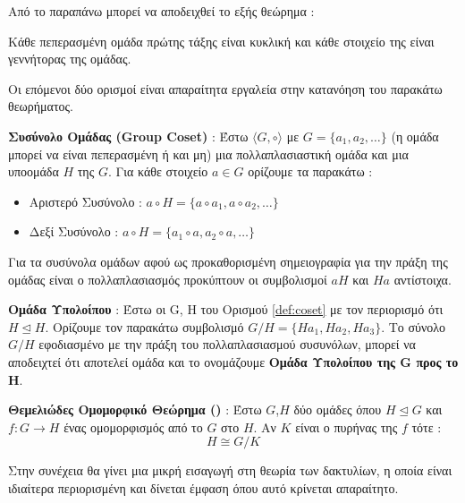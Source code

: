 Από το παραπάνω μπορεί να αποδειχθεί το εξής θεώρημα :
\begin{theorem}
Κάθε πεπερασμένη ομάδα πρώτης τάξης είναι κυκλική και κάθε στοιχείο της είναι γεννήτορας της ομάδας.
\end{theorem}

Οι επόμενοι δύο ορισμοί είναι απαραίτητα εργαλεία στην κατανόηση του παρακάτω θεωρήματος.

\begin{definition}
\label{def:coset}
\textbf{Συσύνολο Ομάδας (Group Coset)} : Έστω $\langle G, \circ \rangle$ με $G = \{a_1, a_2, \ldots\}$ (η ομάδα μπορεί να είναι πεπερασμένη ή και μη) μια πολλαπλασιαστική ομάδα και μια υποομάδα $Η$ της $G$. Για κάθε στοιχείο $a \in G$ ορίζουμε τα παρακάτω :
\begin{itemize}
    \item Αριστερό Συσύνολο : $a \circ H = \{a \circ a_1, a \circ a_2, \ldots\}$
    \item Δεξί Συσύνολο : $a \circ H = \{a_1 \circ a, a_2 \circ a, \ldots\}$
\end{itemize}
\end{definition}

Για τα συσύνολα ομάδων αφού ως προκαθορισμένη σημειογραφία για την πράξη της ομάδας είναι ο πολλαπλασιασμός προκύπτουν οι συμβολισμοί $aΗ$ και $Ha$ αντίστοιχα.

\begin{definition}
\textbf{Ομάδα Υπολοίπου} : Έστω οι G, H του Ορισμού \ref{def:coset} με τον περιορισμό ότι $H \trianglelefteq H$. Ορίζουμε τον παρακάτω συμβολισμό $G / H = \{Ha_1, Ha_2, Ha_3\}$. Το σύνολο $G / H$ εφοδιασμένο με την πράξη του πολλαπλασιασμού συσυνόλων, μπορεί να αποδειχτεί ότι αποτελεί ομάδα και το ονομάζουμε \textbf{Ομάδα Υπολοίπου της G προς το H}.
\end{definition}

\begin{definition}
\textbf{Θεμελιώδες Ομομορφικό Θεώρημα ()} : Έστω $G$,$H$ δύο ομάδες όπου $H \trianglelefteq G$ και $f : G \rightarrow H$ ένας ομομορφισμός από το $G$ στο $H$. Αν $K$ είναι ο πυρήνας της $f$ τότε :
$$
Η \cong G / K
$$
\end{definition}

Στην συνέχεια θα γίνει μια μικρή εισαγωγή στη θεωρία των δακτυλίων, η οποία είναι ιδιαίτερα περιορισμένη και δίνεται έμφαση όπου αυτό κρίνεται απαραίτητο. 


